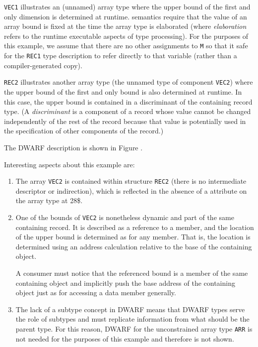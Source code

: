 \texttt{VEC1} illustrates an (unnamed) array type where the upper bound
of the first and only dimension is determined at runtime. 
semantics require that the value of an array bound is fixed at
the time the array type is elaborated (where \textit{elaboration} refers
to the runtime executable aspects of type processing). For
the purposes of this example, we assume that there are no
other assignments to \texttt{M} so that it safe for the \texttt{REC1} type
description to refer directly to that variable (rather than
a compiler-generated copy).

\texttt{REC2} illustrates another array type (the unnamed type of
component \texttt{VEC2}) where the upper bound of the first and only
bound is also determined at runtime. In this case, the upper
bound is contained in a discriminant of the containing record
type. (A \textit{discriminant} is a component of a record whose value
cannot be changed independently of the rest of the record
because that value is potentially used in the specification
of other components of the record.)

The DWARF description is shown in 
Figure .


Interesting aspects about this example are:
\begin{enumerate}[1. ]
\item The array \texttt{VEC2} is  contained within structure
\texttt{REC2} (there is no intermediate descriptor or indirection),
which is reflected in the absence of a \DWATdatalocation{}
attribute on the array type at 28\$.

\item One of the bounds of \texttt{VEC2} is nonetheless dynamic and part of
the same containing record. It is described as a reference to
a member, and the location of the upper bound is determined
as for any member. That is, the location is determined using
an address calculation relative to the base of the containing
object.  

A consumer must notice that the referenced bound is a
member of the same containing object and implicitly push the
base address of the containing object just as for accessing
a data member generally.

\item The lack of a subtype concept in DWARF means that DWARF types
serve the role of subtypes and must replicate information from
what should be the parent type. For this reason, DWARF for
the unconstrained array type \texttt{ARR} is not needed for the purposes
of this example and therefore is not shown.
\end{enumerate}

